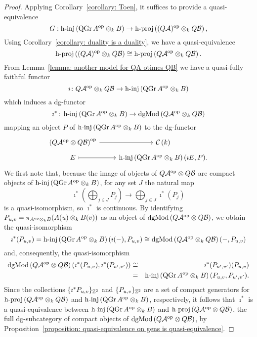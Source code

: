 \begin{proof}
  Applying Corollary~\ref{corollary: Toen}, it suffices to provide a quasi-equivalence
  \begin{displaymath}
    G : \operatorname{h-inj}\left(\operatorname{QGr}A^{\operatorname{op}} \otimes_k B\right) \to \operatorname{h-proj}\left( (Q \mathcal A)^{\operatorname{op}} \otimes_k Q \mathcal B\right),
  \end{displaymath}
  Using Corollary~\ref{corollary: duality is a duality}, we have a quasi-equivalence
  \begin{displaymath}
    \operatorname{h-proj}\left( (Q \mathcal A)^{\operatorname{op}} \otimes_k Q \mathcal B\right) \cong \operatorname{h-proj}\left( Q \mathcal A^{\operatorname{op}} \otimes_k Q \mathcal B\right). 
  \end{displaymath}
  From Lemma~\ref{lemma: another model for QA otimes QB} we have a quasi-fully faithful functor 
  \begin{displaymath}
    \imath \colon Q \mathcal A^{\operatorname{op}} \otimes_k Q \mathcal B \to \operatorname{h-inj}\left(\operatorname{QGr}A^{\operatorname{op}} \otimes_k B\right)
  \end{displaymath}
  which induces a dg-functor
  \begin{displaymath}
    \imath^\ast \colon \operatorname{h-inj}\left(\operatorname{QGr}A^{\operatorname{op}} \otimes_k B\right) \to \operatorname{dgMod}\left(Q \mathcal A^{\operatorname{op}} \otimes_k Q \mathcal B\right)
  \end{displaymath}
  mapping an object \(P\) of \(\operatorname{h-inj}\left(\operatorname{QGr}A^{\operatorname{op}} \otimes_k B\right)\) to the dg-functor
  \[\begin{tikzcd}[row sep=tiny]
  \left(Q\A^\opp \otimes Q\B\right)^\opp \arrow{r} & \CH{k}\\
  E \arrow[mapsto]{r} & \hinj{\QGr{A^\opp \otimes_k B}}(\imath E, P).
  \end{tikzcd}\]
  We first note that, because the image of objects of \(Q\mathcal{A}^{\operatorname{op}} \otimes Q\mathcal{B}\) are compact objects of \(\operatorname{h-inj}\left(\operatorname{QGr}A^{\operatorname{op}} \otimes_k B\right)\), for any set \(J\) the natural map
  \[\imath^\ast\left(\bigoplus_{j \in J} P_j\right)\to \bigoplus_{j \in J} \imath^\ast(P_j)\]
  is a quasi-isomorphism, so \(\imath^\ast\) is continuous.
  By identifying \(P_{u,v} = \pi_{A^{\operatorname{op}} \otimes_k B}(A(u) \otimes_k B(v))\) as an object of \(\operatorname{dgMod}\left(Q\mathcal{A}^{\operatorname{op}} \otimes Q\mathcal{B}\right)\), we obtain the quasi-isomorphism
  \[\imath^\ast(P_{u,v}) = \operatorname{h-inj}\left(\operatorname{QGr}A^{\operatorname{op}} \otimes_k B\right)(\imath(-), P_{u,v}) \cong \operatorname{dgMod}\left(Q\mathcal{A}^{\operatorname{op}} \otimes_k Q\mathcal{B}\right)(-, P_{u,v})\]
  and, consequently, the quasi-isomorphism
  \begin{eqnarray*}
    \operatorname{dgMod}\left(Q\mathcal{A}^{\operatorname{op}} \otimes Q\mathcal{B}\right)(\imath^\ast(P_{u,v}), \imath^\ast(P_{u^\prime, v^\prime}))
    &\cong& \imath^\ast(P_{u^\prime, v^\prime})(P_{u,v}) \\
    &=& \operatorname{h-inj}\left(\operatorname{QGr}A^{\operatorname{op}} \otimes_k B\right)(P_{u,v}, P_{u^\prime, v^\prime}).
  \end{eqnarray*}
  Since the collections \(\{\imath^\ast P_{u,v}\}_{\mathbb{Z}^2}\) and \(\{P_{u,v}\}_{\mathbb{Z}^2}\) are a set of compact generators for \(\operatorname{h-proj}\left(Q\mathcal{A}^{\operatorname{op}} \otimes_k Q\mathcal{B}\right)\) and \(\operatorname{h-inj}\left(\operatorname{QGr}A^{\operatorname{op}} \otimes_k B\right)\), respectively, it follows that \(\imath^\ast\) is a quasi-equivalence between \(\operatorname{h-inj}\left(\operatorname{QGr}A^{\operatorname{op}} \otimes_k B\right)\) and \(\operatorname{h-proj}\left(Q\mathcal{A}^{\operatorname{op}} \otimes Q\mathcal{B}\right)\), the full dg-subcategory of compact objects of \(\operatorname{dgMod}\left(Q\mathcal{A}^{\operatorname{op}} \otimes Q\mathcal{B}\right)\), by Proposition~\ref{proposition: quasi-equivalence on gens is quasi-equivalence}.


\end{proof}
